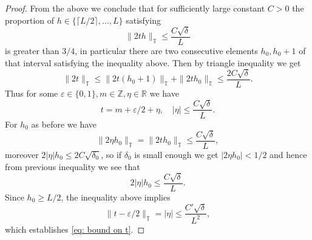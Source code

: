 \documentclass{article}
\newcommand{\T}{\mathbb T}
\theoremstyle{plain}
\numberwithin{equation}{section}
\begin{document}
\begin{proof}
From the above we conclude that for sufficiently large constant $C>0$ the proportion of $h \in \{ \lceil L/2 \rceil, \ldots, L \}$ satisfying
\begin{equation*} 
    \| 2th \|_{\T} \le \frac{C\sqrt{\delta}}{L}
\end{equation*}
is greater than $3/4$, in particular there are two consecutive elements $h_0,h_0+1$ of that interval satisfying the inequality above. Then by triangle inequality we get 
\begin{equation*}
    \|2 t\|_{\T} \le  \|2 t(h_0+1)\|_{\T} +  \|2 th_0\|_{\T} \le \frac{2C\sqrt{\delta}}{L}.
\end{equation*}
Thus for some $\varepsilon \in \{0,1\}, m \in \mathbb Z, \eta \in \mathbb R$ we have 
\begin{equation*}
    t=  m+\varepsilon/2+ \eta, \quad \left |\eta \right| \le  \frac{C\sqrt{\delta}}{L}.
\end{equation*}
For $h_0$ as before we have 
\begin{equation*}
    \|2 \eta h_0 \|_{\T}= \|2th_0 \|_{\T} \le \frac{C\sqrt{\delta}}{L},
\end{equation*}
moreover $2 |\eta|h_0 \le 2C\sqrt{\delta_0}$, so if $\delta_0$ is small enough we get $|2 \eta h_0|<1/2$ and hence from previous inequality we see that
\begin{equation*}
    2|\eta|h_0 \le \frac{C\sqrt{\delta}}{L}.
\end{equation*}
Since $h_0 \ge L/2$, the inequality above implies
\begin{equation} \label{eq: t-eps bound}
    \|t-\varepsilon/2 \|_{\T}=|\eta| \le \frac{C'\sqrt{\delta}}{L^2},
\end{equation}
which establishes \eqref{eq: bound on t}. 


\end{proof}
\end{document}
